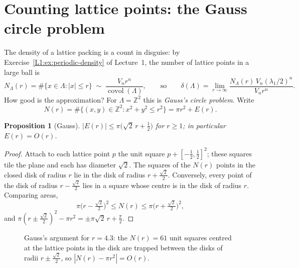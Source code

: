 \documentclass[11pt,openany]{book}
\theoremstyle{plain}
\newtheorem{proposition}[theorem]{Proposition}
\theoremstyle{definition}
\theoremstyle{remark}
\newcommand{\Z}{\mathbb{Z}}
\newcommand{\Lat}{\Lambda}             %
\newcommand{\covol}{\operatorname{covol}}
\newcommand{\abs}[1]{\left\lvert #1 \right\rvert}
\newcommand{\dens}{\delta}             %
\begin{document}
\section{Counting lattice points: the Gauss circle problem}
\label{NT:sec:circle}

The density of a lattice packing is a count in disguise: by Exercise~\ref{L1:ex:periodic-density} of
Lecture~1, the number of lattice points in a large ball is
\[
  N_\Lat(r)=\#\{x\in\Lat:\abs x\le r\}\;\sim\;\frac{V_nr^n}{\covol(\Lat)},
  \qquad\text{so}\qquad
  \dens(\Lat)=\lim_{r\to\infty}\frac{N_\Lat(r)\,V_n(\lambda_1/2)^n}{V_nr^n}.
\]
How good is the approximation? For $\Lat=\Z^2$ this is \emph{Gauss's circle problem}. Write
\[
  N(r)=\#\{(x,y)\in\Z^2:x^2+y^2\le r^2\}=\pi r^2+E(r).
\]

\begin{proposition}[Gauss]\label{NT:prop:gauss}
$\abs{E(r)}\le\pi\big(\sqrt2\,r+\tfrac12\big)$ for $r\ge1$; in particular $E(r)=O(r)$.
\end{proposition}

\begin{proof}
Attach to each lattice point $p$ the unit square $p+[-\frac12,\frac12]^2$; these squares tile the plane
and each has diameter $\sqrt2$. The squares of the $N(r)$ points in the closed disk of radius $r$ lie
in the disk of radius $r+\frac{\sqrt2}2$. Conversely, every point of the disk of radius
$r-\frac{\sqrt2}2$ lies in a square whose centre is in the disk of radius $r$. Comparing areas,
\[
  \pi\big(r-\tfrac{\sqrt2}{2}\big)^2\le N(r)\le\pi\big(r+\tfrac{\sqrt2}{2}\big)^2,
\]
and $\pi(r\pm\frac{\sqrt2}2)^2-\pi r^2=\pm\pi\sqrt2\,r+\frac\pi2$.
\end{proof}

\begin{figure}[ht]
\centering
{}
\caption{Gauss's argument for $r=4.3$: the $N(r)=61$ unit squares centred at the lattice points in the
disk are trapped between the disks of radii $r\pm\frac{\sqrt2}{2}$, so $\abs{N(r)-\pi r^2}=O(r)$.}
\label{NT:fig:gauss}
\end{figure}
\end{document}
